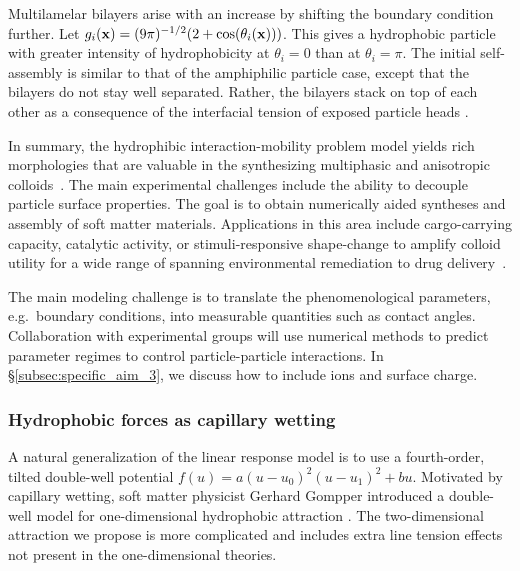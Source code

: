 Multilamelar bilayers arise with an increase by shifting the boundary
condition further. Let $g_i(\mathbf{x}) = (9\pi )^{-1/2}(2 +
\cos(\theta_i(\mathbf{x})))$. This gives a hydrophobic particle with greater
intensity of hydrophobicity at $\theta_i = 0$ than at $\theta_i = \pi$.
The initial self-assembly is similar to that of the amphiphilic particle
case, except that the bilayers do not stay well separated. Rather, the
bilayers stack on top of each other as a consequence of the interfacial
tension of exposed particle heads \cite{deMeetal21}. 

In summary, the hydrophibic interaction-mobility problem model yields
rich morphologies that are valuable in the synthesizing multiphasic and
anisotropic colloids~\cite{Bradley2016,Mallory2017,Bradley2017}. The
main experimental challenges include the ability to decouple particle
surface properties. The goal is to obtain numerically aided syntheses
and assembly of soft matter materials. Applications in this area include
cargo-carrying capacity, catalytic activity, or stimuli-responsive
shape-change to amplify colloid utility for a wide range of spanning
environmental remediation to drug delivery~\cite{McBr21, HaBr20}.



The main modeling challenge is to translate the phenomenological
parameters, e.g.~boundary conditions, into measurable quantities such as
contact angles. Collaboration with experimental groups will use
numerical methods to predict parameter regimes to control
particle-particle interactions. In \S\ref{subsec:specific_aim_3}, we
discuss how to include ions and surface charge. 

\subsubsection{Hydrophobic forces as capillary wetting}
A natural generalization of the linear response model is to use a
fourth-order, tilted double-well potential $f(u) = a(u-u_0)^2(u-u_1)^2 +
bu$. Motivated by capillary wetting, soft matter physicist Gerhard
Gompper introduced a double-well model for one-dimensional
hydrophobic attraction \cite{GoHaKo94}. The two-dimensional attraction
we propose is more complicated and includes extra line tension effects
not present in the one-dimensional theories. 

